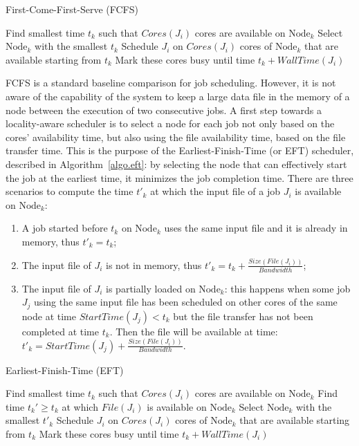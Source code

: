 \documentclass[conference]{IEEEtran}
\newcommand{\Node}[1]{\ensuremath{\mathrm{Node}_{#1}}\xspace}
\newcommand{\file}{\ensuremath{\mathit{File}}\xspace}
\newcommand{\size}{\ensuremath{\mathit{Size}}\xspace}
\newcommand{\bandwidth}{\mathit{Bandwidth}\xspace}
\newcommand{\core}{\mathit{Cores}\xspace}
\newcommand{\walltime}{\mathit{WallTime}\xspace}
\newcommand{\start}{\mathit{StartTime}\xspace}
\newcommand{\nodeset}{\ensuremath{\mathbb{N}}\xspace}
\begin{document}
\begin{algorithm}[htbp]%
\caption{First-Come-First-Serve (FCFS)}\label{algo.fcfs}
\begin{algorithmic}[1]
        \ForEach{$\Node{k} \in \nodeset$}
        \State Find smallest time $t_k$ such that $\core(J_i)$ cores are available on \Node{k}\label{fcfs.ln.find}
        \EndFor
        \State Select \Node{k}  with the smallest $t_k$
        \State Schedule $J_i$ on $\core(J_i)$ cores of \Node{k} that are available starting from $t_k$
        \State Mark these cores busy until time $t_k +\walltime(J_i)$
	\EndFor
	\end{algorithmic}
\end{algorithm}


FCFS is a standard baseline comparison
for job scheduling. However, it is not aware of the capability of the
system to keep a large data file in the memory of a node between the execution of
two consecutive jobs.
A first step towards a locality-aware scheduler
is to select a node for each job not only based on the cores' availability
time, but also using the file availability time, based on the file
transfer time. This is the purpose of the Earliest-Finish-Time (or
EFT) scheduler, described in Algorithm~\ref{algo.eft}: by selecting
the node that can effectively start the job at the earliest time, it
minimizes the job completion time. There are three scenarios to compute the
time $t'_k$ at which the input file of a job $J_i$ is available on
\Node{k}:
\begin{enumerate}
\item A job started before $t_k$ on \Node{k} uses the same input
  file and it is already in memory, thus $t'_k=t_k$;
\item The input file of $J_i$ is not in memory, thus
  $t'_k=t_k+\frac{\size(\file(J_i))}{\bandwidth}$;
\item The input file of $J_i$ is partially loaded on \Node{k}: this
  happens when some
  job $J_j$ using the same input file has been scheduled on other cores of
  the same node at time $\start(J_j)<t_k$ but the file transfer has not been
  completed at time $t_k$. Then the file will be available at time:
  $t'_k = \start(J_j)+\frac{\size(\file(J_i))}{\bandwidth}.$
\end{enumerate}

		
\begin{algorithm}[htbp]%
\caption{Earliest-Finish-Time (EFT)}\label{algo.eft}
\begin{algorithmic}[1]
		\ForEach{$\Node{k} \in \nodeset$}
			\State Find smallest time $t_k$ such that $\core(J_i)$ cores are available on \Node{k}
			\State Find time $t_k' \geq t_k$ at which $\file(J_i)$ is available on $\Node{k}$ 
		\EndFor
                \State Select \Node{k}  with the smallest $t'_k$
                \State Schedule $J_i$ on $\core(J_i)$ cores of \Node{k} that are available starting from $t_k$
                \State Mark these cores busy until time $t_k +\walltime(J_i)$
	\EndFor
\end{algorithmic}
\end{algorithm}
\end{document}
